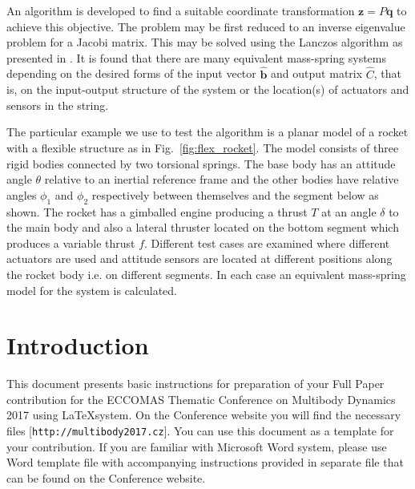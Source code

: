 \documentclass{mbd_fullpaper}
\begin{document}
An algorithm is developed to find a suitable coordinate transformation $\mathbf{z} = P \mathbf{q}$ to achieve this objective.
The problem may be first reduced to an inverse eigenvalue problem for a Jacobi matrix. This may be solved using the Lanczos algorithm as presented in \cite{gladwell1986inverse}. 
It is found that there are many equivalent mass-spring systems depending on the desired forms of the input vector $\hat{\mathbf{b}}$ and output matrix $\hat{C}$, that is, on the input-output structure of the system or the location(s) of actuators and sensors in the string.

The particular example we use to test the algorithm is a planar model of a rocket with a flexible structure as in Fig.~\ref{fig:flex_rocket}. The model consists of three rigid bodies connected by two torsional springs. The base body has an attitude angle $\theta$ relative to an inertial reference frame and the other bodies have relative angles $\phi_1$ and $\phi_2$ respectively between themselves and the segment below as shown. The rocket has a gimballed engine producing a thrust $T$ at an angle $\delta$ to the main body and also a lateral thruster located on the bottom segment which produces a variable thrust $f$. Different test cases are examined where different actuators are used and attitude sensors are located at different positions along the rocket body i.e. on different segments. In each case an equivalent mass-spring model for the system is calculated.

\section{Introduction}

This document presents basic instructions for preparation of your Full Paper contribution for the ECCOMAS Thematic Conference on Multibody Dynamics 2017 using \LaTeX system. On the Conference website you will find the necessary files [\texttt{http://multibody2017.cz}]. You can use this document as a template for your contribution. If you are familiar with Microsoft Word system, please use Word template file with accompanying instructions provided in separate file that can be found on the Conference website.
\end{document}
